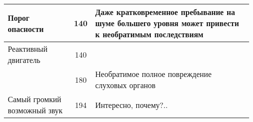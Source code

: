 \begin{center}
\begin{longtable}{|p{}|c|p{}|}
    \hline
    Порог опасности              & 140   & \small{Даже кратковременное пребывание на
    шуме большего уровня может привести к необратимым последствиям}                       \\
    \hline
    Реактивный двигатель         & 140   &                                                \\
                                 & 180   & \small{Необратимое полное повреждение
                                 слуховых органов}                                        \\
    Самый громкий возможный звук & 194   & \small{Интересно, почему?..}                   \\
  \end{longtable}
\end{center}
